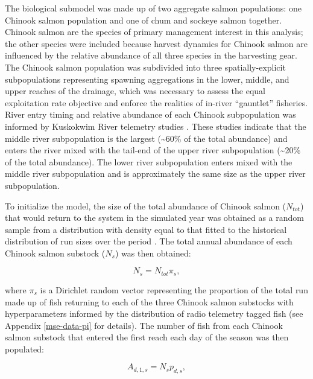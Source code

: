 \documentclass[12pt,]{book}
\theoremstyle{definition}
\theoremstyle{definition}
\theoremstyle{definition}
\theoremstyle{remark}
\begin{document}
\noindent
The biological submodel was made up of two aggregate salmon populations:
one Chinook salmon population and one of chum and sockeye salmon
together. Chinook salmon are the species of primary management interest
in this analysis; the other species were included because harvest
dynamics for Chinook salmon are influenced by the relative abundance of
all three species in the harvesting gear. The Chinook salmon population
was subdivided into three spatially-explicit subpopulations representing
spawning aggregations in the lower, middle, and upper reaches of the
drainage, which was necessary to assess the equal exploitation rate
objective and enforce the realities of in-river ``gauntlet'' fisheries.
River entry timing and relative abundance of each Chinook subpopulation
was informed by Kuskokwim River telemetry studies
\citep{stuby-2007, smith-liller-2017a, smith-liller-2017b}. These
studies indicate that the middle river subpopulation is the largest
(\textasciitilde{}60\% of the total abundance) and enters the river
mixed with the tail-end of the upper river subpopulation
(\textasciitilde{}20\% of the total abundance). The lower river
subpopulation enters mixed with the middle river subpopulation and is
approximately the same size as the upper river subpopulation.

To initialize the model, the size of the total abundance of Chinook
salmon (\(N_{tot}\)) that would return to the system in the simulated
year was obtained as a random sample from a distribution with density
equal to that fitted to the historical distribution of run sizes over
the period \citep[1976 -- 2017; as presented in][ and further described
in Appendix \ref{mse-data-N}]{liller-etal-2018}. The total annual
abundance of each Chinook salmon substock (\(N_s\)) was then obtained:

\begin{equation}
  N_s=N_{tot} \pi_s,
  \label{eq:get-ns}
\end{equation}

\noindent
where \(\pi_s\) is a Dirichlet random vector representing the proportion
of the total run made up of fish returning to each of the three Chinook
salmon substocks with hyperparameters informed by the distribution of
radio telemetry tagged fish (see Appendix \ref{mse-data-pi} for
details). The number of fish from each Chinook salmon substock that
entered the first reach each day of the season was then populated:

\begin{equation}
A_{d,1,s}=N_s p_{d,s},
  \label{eq:get-chin-entry}
\end{equation}
\end{document}
